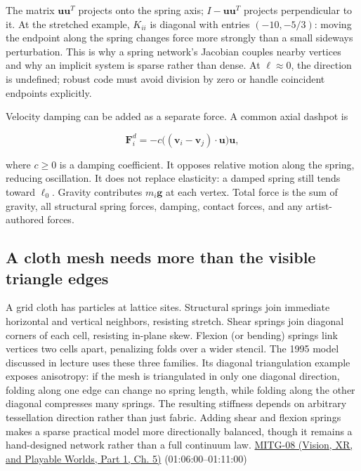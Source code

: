 The matrix \(\boldsymbol{u}\boldsymbol{u}^{T}\) projects onto the spring axis; \(I-\boldsymbol{u}\boldsymbol{u}^{T}\) projects perpendicular to it. At the stretched example, \(K_{ii}\) is diagonal with entries \((-10,-5/3)\): moving the endpoint along the spring changes force more strongly than a small sideways perturbation. This is why a spring network's Jacobian couples nearby vertices and why an implicit system is sparse rather than dense. At \(\ell\approx0\), the direction is undefined; robust code must avoid division by zero or handle coincident endpoints explicitly.

Velocity damping can be added as a separate force. A common axial dashpot is

\[
\boldsymbol{F}^{d}_i=-c\big((\boldsymbol{v}_i-\boldsymbol{v}_j)\cdot\boldsymbol{u}\big)\boldsymbol{u},
\]

where \(c\ge0\) is a damping coefficient. It opposes relative motion along the spring, reducing oscillation. It does not replace elasticity: a damped spring still tends toward \(\ell_0\). Gravity contributes \(m_i\boldsymbol{g}\) at each vertex. Total force is the sum of gravity, all structural spring forces, damping, contact forces, and any artist-authored forces.

\subsection{A cloth mesh needs more than the visible triangle edges}\label{04-visual-computing-ii-ch029-a-cloth-mesh-needs-more-than-the-visible-triangle-edges}

\hypertarget{04-visual-computing-ii-ch029-a-cloth-mesh-needs-more-than-the-visible-triangle-edges}{}

A grid cloth has particles at lattice sites. Structural springs join immediate horizontal and vertical neighbors, resisting stretch. Shear springs join diagonal corners of each cell, resisting in-plane skew. Flexion (or bending) springs link vertices two cells apart, penalizing folds over a wider stencil. The 1995 model discussed in lecture uses these three families. Its diagonal triangulation example exposes anisotropy: if the mesh is triangulated in only one diagonal direction, folding along one edge can change no spring length, while folding along the other diagonal compresses many springs. The resulting stiffness depends on arbitrary tessellation direction rather than just fabric. Adding shear and flexion springs makes a sparse practical model more directionally balanced, though it remains a hand-designed network rather than a full continuum law. \href{../07-Vision-XR-and-Playable-Worlds-P01/main.pdf\#nameddest=04-visual-computing-ii-ch036-mitg-08---cloth-simulation}{MITG-08 (Vision, XR, and Playable Worlds, Part 1, Ch. 5)} (01:06:00--01:11:00)

